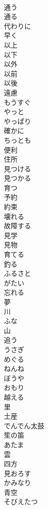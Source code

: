 \documentclass[8pt]{extreport}
\begin{document}
\begin{CJK}{UTF8}{min}
\\	通う
\\	通る
\\	代わりに
\\	早く
\\	以上
\\	以下
\\	以外
\\	以前
\\	以後
\\	遠慮
\\	もうすぐ
\\	やっと
\\	やっぱり
\\	確かに
\\	ちっとも
\\	便利
\\	住所
\\	見つける
\\	見つかる
\\	育つ
\\	予約
\\	約束
\\	壊れる
\\	故障する
\\	見学
\\	見物
\\	育てる
\\	釣る
\\	ふるさと
\\	がたい
\\	忘れる
\\	夢
\\	川
\\	ふな
\\	山
\\	追う
\\	うさぎ
\\	めぐる
\\	ねんね
\\	ぼうや
\\	おもり
\\	越える
\\	里
\\	土産
\\	でんでん太鼓
\\	笙の笛
\\	あたま
\\	雲
\\	四方
\\	見おろす
\\	かみなり
\\	青空
\\	そびえたつ

\end{CJK}
\end{document}
